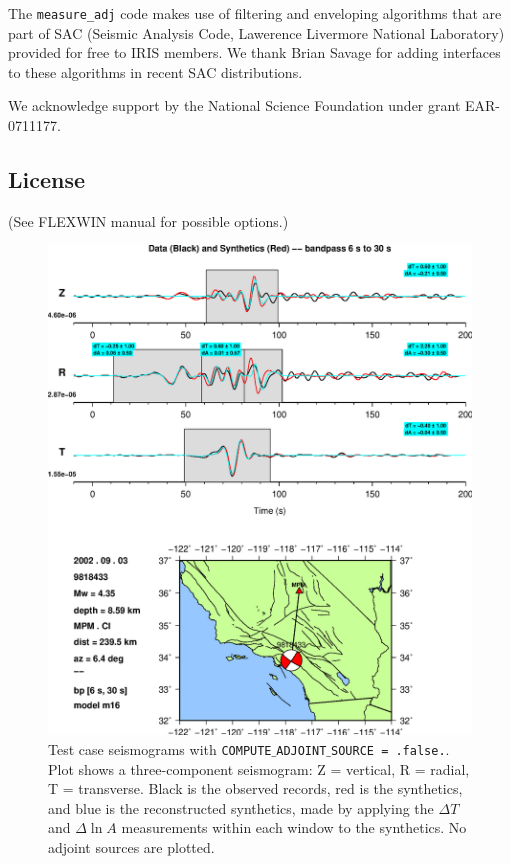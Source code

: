 \documentclass[11pt,titlepage,fleqn]{article}
\begin{document}
The \verb+measure_adj+ code makes use of filtering and enveloping algorithms that are part of SAC (Seismic Analysis Code, Lawerence Livermore National Laboratory) provided for free to IRIS members.  We thank Brian Savage for adding interfaces to these algorithms in recent SAC distributions. 

We acknowledge support by the National Science Foundation under grant EAR-0711177.


\subsection{License}

(See FLEXWIN manual for possible options.)

\pagebreak
\begin{spacing}{1}

%

\end{spacing}

\begin{figure}
\includegraphics[width=17cm]{9818433_T006_T030_MPM_CI_m16_win.eps}
\caption[]
{{
Test case seismograms with {\tt COMPUTE$\_$ADJOINT$\_$SOURCE = .false.}.  Plot shows a three-component seismogram: Z = vertical, R = radial, T = transverse.  Black is the observed records, red is the synthetics, and blue is the reconstructed synthetics, made by applying the $\Delta T$ and $\Delta \ln A$ measurements within each window to the synthetics.  No adjoint sources are plotted.
\label{fig:noadj}
}}
\end{figure}
\end{document}
